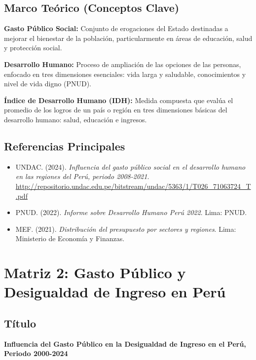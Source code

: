 \documentclass[
  man,
  floatsintext,
  longtable,
  a4paper,
  nolmodern,
  notxfonts,
  notimes,
  12pt,
  colorlinks=true,linkcolor=blue,citecolor=blue,urlcolor=blue]{apa7}
\providecommand{\tightlist}{%
  \setlength{\itemsep}{0pt}\setlength{\parskip}{0pt}}
\begin{document}
\subsection{Marco Teórico (Conceptos
Clave)}\label{marco-teuxf3rico-conceptos-clave}

\textbf{Gasto Público Social:} Conjunto de erogaciones del Estado
destinadas a mejorar el bienestar de la población, particularmente en
áreas de educación, salud y protección social.

\textbf{Desarrollo Humano:} Proceso de ampliación de las opciones de las
personas, enfocado en tres dimensiones esenciales: vida larga y
saludable, conocimientos y nivel de vida digno (PNUD).

\textbf{Índice de Desarrollo Humano (IDH):} Medida compuesta que evalúa
el promedio de los logros de un país o región en tres dimensiones
básicas del desarrollo humano: salud, educación e ingresos.

\subsection{Referencias Principales}\label{referencias-principales}

\begin{itemize}
\tightlist
\item
  UNDAC. (2024). \emph{Influencia del gasto público social en el
  desarrollo humano en las regiones del Perú, periodo 2008-2021}.
  \url{http://repositorio.undac.edu.pe/bitstream/undac/5363/1/T026_71063724_T.pdf}
\item
  PNUD. (2022). \emph{Informe sobre Desarrollo Humano Perú 2022}. Lima:
  PNUD.
\item
  MEF. (2021). \emph{Distribución del presupuesto por sectores y
  regiones}. Lima: Ministerio de Economía y Finanzas.
\end{itemize}

\section{Matriz 2: Gasto Público y Desigualdad de Ingreso en
Perú}\label{matriz-2-gasto-puxfablico-y-desigualdad-de-ingreso-en-peruxfa}

\subsection{Título}\label{tuxedtulo-1}

\textbf{Influencia del Gasto Público en la Desigualdad de Ingreso en el
Perú, Periodo 2000-2024}
\end{document}
